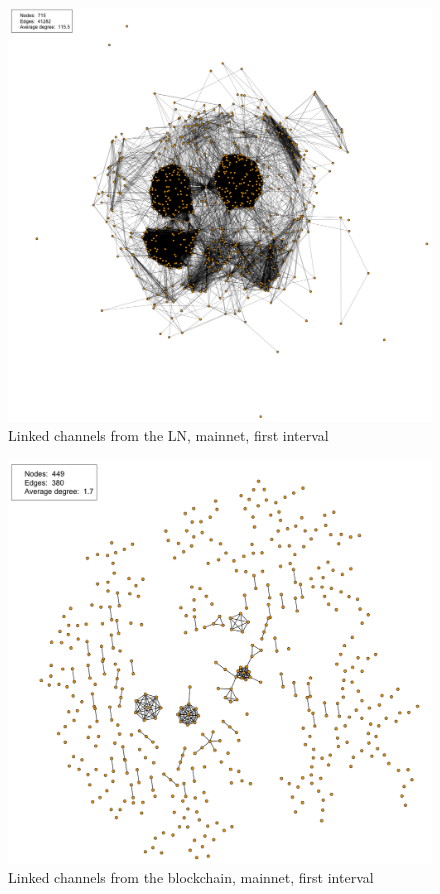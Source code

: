 \begin{figure}[ht]
    \centering
    \includegraphics[width=13cm]{figures/graphs/cg_ln_mainnet_run1.png}
    \caption{Linked channels from the LN, mainnet, first interval}
    \label{fig:channel_network_LN_mainent}
\end{figure}

\begin{figure}[ht]
    \centering
    \includegraphics[width=13cm]{figures/graphs/cg_bc_mainnet_run1.png}
    \caption{Linked channels from the blockchain, mainnet, first interval}
    \label{fig:channel_network_BC_mainnet}
\end{figure}
